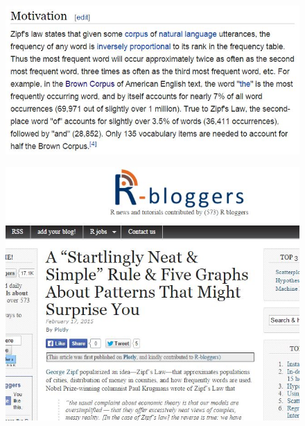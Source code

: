 \documentclass[MAIN.tex]{subfiles}
\begin{document}
 
\begin{frame}
	\begin{figure}
		\centering
		\includegraphics[width=1.01\linewidth]{images/zipfwiki}
	\end{figure}
	
\end{frame}
\begin{frame}
	\begin{figure}
\centering
\includegraphics[width=1.01\linewidth]{images/zipf-plotly}
\end{figure}

\end{frame}
\end{document}

